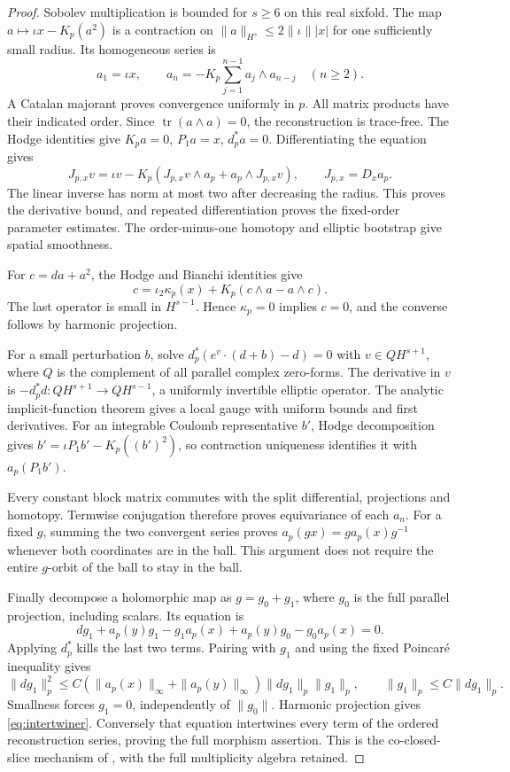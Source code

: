 \documentclass[11pt]{amsart}
\theoremstyle{definition}
\theoremstyle{remark}
\newcommand{\tr}{\operatorname{tr}}
\begin{document}
\begin{proof}
Sobolev multiplication is bounded for $s\ge6$ on this real sixfold.
The map $a\mapsto\iota x-K_p(a^2)$ is a contraction on
$\|a\|_{H^s}\le2\|\iota\||x|$ for one sufficiently small radius.
Its homogeneous series is
\[
 a_1=\iota x,\qquad
 a_n=-K_p\sum_{j=1}^{n-1}a_j\wedge a_{n-j}\quad(n\ge2).
\]
A Catalan majorant proves convergence uniformly in $p$. All matrix
products have their indicated order. Since $\tr(a\wedge a)=0$,
the reconstruction is trace-free. The Hodge identities give
$K_pa=0$, $P_1a=x$, $d_p^*a=0$. Differentiating the equation gives
\begin{equation}\label{eq:reconstruction-derivative}
 J_{p,x}v=\iota v-K_p(J_{p,x}v\wedge a_p+a_p\wedge J_{p,x}v),
 \qquad J_{p,x}=D_xa_p.
\end{equation}
The linear inverse has norm at most two after decreasing the radius.
This proves the derivative bound, and repeated differentiation proves
the fixed-order parameter estimates. The order-minus-one homotopy
and elliptic bootstrap give spatial smoothness.

For $c=da+a^2$, the Hodge and Bianchi identities give
\begin{equation}\label{eq:bianchi-reconstruction}
 c=\iota_2\kappa_p(x)+K_p(c\wedge a-a\wedge c).
\end{equation}
The last operator is small in $H^{s-1}$. Hence $\kappa_p=0$ implies
$c=0$, and the converse follows by harmonic projection.

For a small perturbation $b$, solve
$d_p^*(e^v\cdot(d+b)-d)=0$ with $v\in QH^{s+1}$, where $Q$
is the complement of all parallel complex zero-forms. The derivative
in $v$ is $-d_p^*d:QH^{s+1}\to QH^{s-1}$, a uniformly invertible
elliptic operator. The analytic implicit-function theorem gives a
local gauge with uniform bounds and first derivatives. For an
integrable Coulomb representative $b'$, Hodge decomposition gives
$b'=\iota P_1b'-K_p((b')^2)$, so contraction uniqueness identifies
it with $a_p(P_1b')$.

Every constant block matrix commutes with the split differential,
projections and homotopy. Termwise conjugation therefore proves
equivariance of each $a_n$. For a fixed $g$, summing the two convergent
series proves $a_p(gx)=ga_p(x)g^{-1}$ whenever both coordinates are
in the ball. This argument does not require the entire $g$-orbit of
the ball to stay in the ball.

Finally decompose a holomorphic map as $g=g_0+g_1$, where $g_0$ is
the full parallel projection, including scalars. Its equation is
\[
 dg_1+a_p(y)g_1-g_1a_p(x)+a_p(y)g_0-g_0a_p(x)=0.
\]
Applying $d_p^*$ kills the last two terms. Pairing with $g_1$ and
using the fixed Poincar\'e inequality gives
\[
 \|dg_1\|_p^2\le
 C(\|a_p(x)\|_\infty+\|a_p(y)\|_\infty)\|dg_1\|_p\|g_1\|_p,
 \qquad \|g_1\|_p\le C\|dg_1\|_p.
\]
Smallness forces $g_1=0$, independently of $\|g_0\|$. Harmonic
projection gives \eqref{eq:intertwiner}. Conversely that equation
intertwines every term of the ordered reconstruction series, proving
the full morphism assertion. This is the co-closed-slice mechanism
of \cite[Proposition 4.5 and Corollary 4.6]{BuchdahlSchumacher20},
with the full multiplicity algebra retained.
\end{proof}
\end{document}
